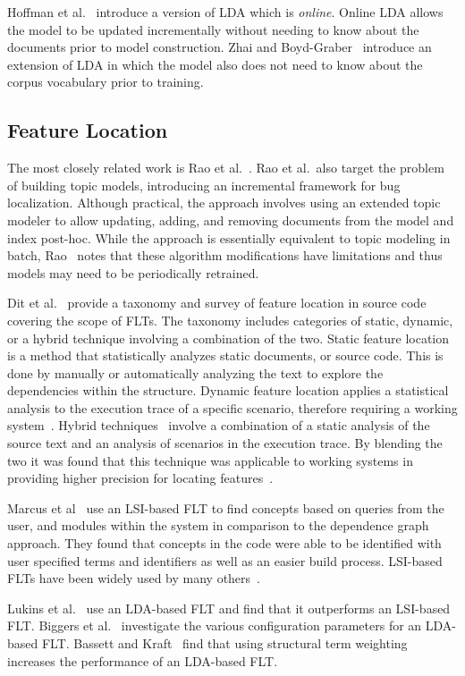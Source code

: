 Hoffman et al.~\cite{Hoffman-etal:2010} introduce a version of LDA which is
\emph{online}.  Online LDA allows the model to be updated incrementally without
needing to know about the documents prior to model construction.  Zhai and
Boyd-Graber~\cite{Zhai-Boyd-Graber:2013} introduce an extension of LDA in which
the model also does not need to know about the corpus vocabulary prior to
training.


\subsection{Feature Location}

The most closely related work is Rao et al.~\cite{Rao-etal:2013}. Rao et al.\
also target the problem of building topic models, introducing an incremental
framework for bug localization.  Although practical, the approach involves using
an extended topic modeler to allow updating, adding, and removing documents from
the model and index post-hoc.  While the approach is essentially equivalent to
topic modeling in batch, Rao~\cite{Rao:2013} notes that these algorithm
modifications have limitations and thus models may need to be periodically
retrained.

Dit et al.~\cite{Dit-etal:2011} provide a taxonomy and survey of feature
location in source code covering the scope of FLTs.
The taxonomy includes categories of static, dynamic, or a hybrid
technique involving a combination of the two. Static feature
location~\cite{Zhao-etal:2006} is a method that statistically analyzes static
documents, or source code. This is done by manually or automatically analyzing
the text to explore the dependencies within the structure. Dynamic feature
location applies a statistical analysis to the execution trace of a specific
scenario, therefore requiring a working
system~\cite{Eisenbarth-etal:2001,Poshyvanyk-etal:2007}.  Hybrid
techniques~\cite{Eisenbarth-etal:2003, Eaddy-etal:2008, Revelle-etal:2010}
involve a combination of a static analysis of the source text and an analysis of
scenarios in the execution trace. By blending the two it was found that this
technique was applicable to working systems in providing higher precision for
locating features~\cite{Poshyvanyk-etal:2007, Ernst:2004, Revelle-Coppitt:UNK}.

Marcus et al~\cite{Marcus-etal:2004} use an LSI-based FLT to find
concepts based on queries from the user, and modules within the system in
comparison to the dependence graph approach. They found that concepts in the
code were able to be identified with user specified terms and identifiers as
well as an easier build process. LSI-based FLTs have been widely used by many
others~\cite{ Poshyvanyk-etal:2006, Poshyvanyk-Marcus:2007, Liu-etal:2007,
Scanniello-Marcus:2011, Eaddy-etal:2008, Cubranic-etal:2005}.

Lukins et al.~\cite{Lukins-etal:2008} use an LDA-based FLT and find that it
outperforms an LSI-based FLT.  Biggers et al.~\cite{Biggers-etal:2014}
investigate the various configuration parameters for an LDA-based FLT.  Bassett
and Kraft~\cite{Bassett-Kraft:2013} find that using structural term weighting
increases the performance of an LDA-based FLT.
